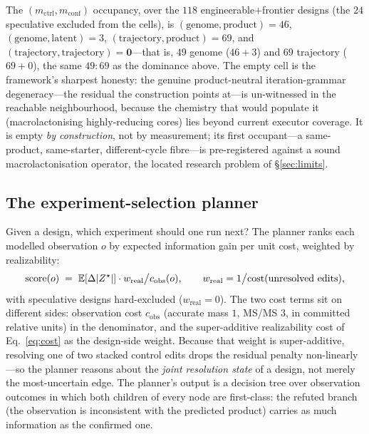 The $(m_{\mathrm{ctrl}},m_{\mathrm{conf}})$ occupancy, over the $118$ engineerable$+$frontier designs (the
$24$ speculative excluded from the cells), is $(\text{genome},\text{product}){=}46$,
$(\text{genome},\text{latent}){=}3$, $(\text{trajectory},\text{product}){=}69$, and
$(\text{trajectory},\text{trajectory}){=}\mathbf{0}$---that is, $49$ genome ($46{+}3$) and $69$ trajectory
($69{+}0$), the same $49\!:\!69$ as the dominance above. The empty cell is the framework's sharpest honesty:
the genuine product-neutral iteration-grammar degeneracy---the residual the construction points at---is
un-witnessed in the reachable neighbourhood, because the chemistry that would populate it (macrolactonising
highly-reducing cores) lies beyond current executor coverage. It is empty \emph{by construction}, not by
measurement; its first occupant---a same-product, same-starter, different-cycle fibre---is pre-registered
against a sound macrolactonisation operator, the located research problem of \S\ref{sec:limits}.

\subsection{The experiment-selection planner}\label{sec:planner}
Given a design, which experiment should one run next? The planner ranks each modelled observation $o$ by
expected information gain per unit cost, weighted by realizability:
\begin{equation}
\mathrm{score}(o) \;=\; \mathbb{E}\!\left[\Delta|Z^{\star}|\right]\cdot w_{\text{real}}\big/ c_{\text{obs}}(o),
\qquad w_{\text{real}} = 1\big/\mathrm{cost}(\text{unresolved edits}),
\label{eq:planner}
\end{equation}
with speculative designs hard-excluded ($w_{\text{real}}=0$). The two cost terms sit on different sides:
observation cost $c_{\text{obs}}$ (accurate mass $1$, MS/MS $3$, in committed relative units) in the
denominator, and the super-additive realizability cost of Eq.~\eqref{eq:cost} as the design-side weight.
Because that weight is super-additive, resolving one of two stacked control edits drops the residual
penalty non-linearly---so the planner reasons about the \emph{joint resolution state} of a design, not
merely the most-uncertain edge. The planner's output is a decision tree over observation outcomes in
which both children of every node are first-class: the refuted branch (the observation is inconsistent
with the predicted product) carries as much information as the confirmed one.


